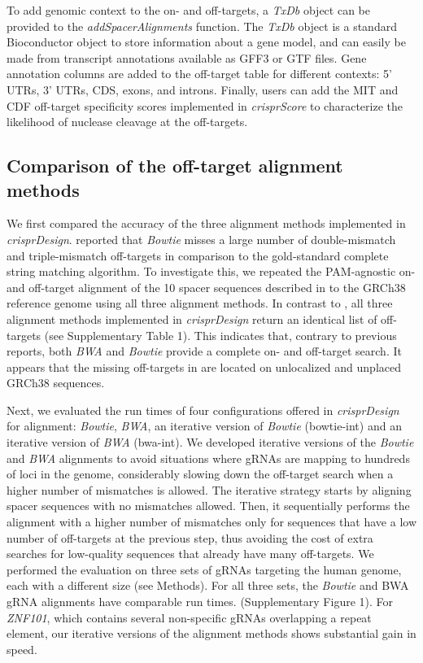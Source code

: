 \documentclass[pdftex,english,10pt]{article}
\begin{document}
To add genomic context to the on- and off-targets, a \textit{TxDb} object can be provided to the \textit{addSpacerAlignments} function. 
The \textit{TxDb} object is a standard Bioconductor object to store information about a gene model, and can easily be made from transcript annotations available as GFF3 or GTF files. Gene annotation columns are added to the off-target table for different contexts: 5' UTRs, 3' UTRs, CDS, exons, and introns. Finally, users can add the MIT and CDF off-target specificity scores \citep{mit, azimuth} implemented in \textit{crisprScore} to characterize the likelihood of nuclease cleavage at the off-targets. 






\subsection*{Comparison of the off-target alignment methods}


We first compared the accuracy of the three alignment methods implemented in \textit{crisprDesign}. \citet{multicrispr} reported that \textit{Bowtie} misses a large number of double-mismatch and triple-mismatch off-targets in comparison to the gold-standard complete string matching algorithm.
To investigate this, we repeated the PAM-agnostic on- and off-target alignment of the 10 spacer sequences described in \citet{multicrispr} to the GRCh38 reference genome using all three alignment methods. In contrast to \citet{multicrispr}, all three alignment methods implemented in \textit{crisprDesign} return an identical list of off-targets (see Supplementary Table 1). This indicates that, contrary to previous reports, both \textit{BWA} and \textit{Bowtie} provide a complete on- and off-target search. It appears that the missing off-targets in \citet{multicrispr} are located on unlocalized and unplaced GRCh38 sequences.

Next, we evaluated the run times of four configurations offered in \textit{crisprDesign} for alignment: \textit{Bowtie}, \textit{BWA}, an iterative version of \textit{Bowtie} (bowtie-int) and an iterative version of \textit{BWA} (bwa-int). We developed iterative versions of the \textit{Bowtie} and \textit{BWA} alignments to avoid situations where gRNAs are mapping to hundreds of loci in the genome, considerably slowing down the off-target search when a higher number of mismatches is allowed.  The iterative strategy starts by aligning spacer sequences with no mismatches allowed. Then, it sequentially performs the alignment with a higher number of mismatches only for sequences that have a low number of off-targets at the previous step, thus avoiding the cost of extra searches for low-quality sequences that already have many off-targets.  We performed the evaluation on three sets of gRNAs targeting the human genome, each with a different size (see Methods).  For all three sets, the \textit{Bowtie} and BWA gRNA alignments have comparable run times. (Supplementary Figure 1). For \textit{ZNF101}, which contains several non-specific gRNAs overlapping a repeat element, our iterative versions of the alignment methods shows substantial gain in speed. 
\end{document}
